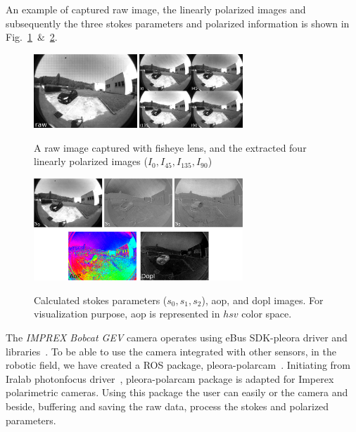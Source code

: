 An example of captured raw image, the linearly polarized
images and subsequently the three stokes parameters and polarized information
is shown in Fig.~\ref{fig:raw-sp}~$\&$~\ref{fig:stokes-aop-dop}.

\begin{figure}
  \centering
  \includegraphics[width=0.7\textwidth]{./content/intro/figures/raw-sp.png}
  \label{fig:raw-sp}
  \caption{A raw image captured with fisheye lens, and the extracted four
    linearly polarized images ($I_0, I_{45}, I_{135}, I_{90}$)}
\end{figure}

\begin{figure}
  \centering
  \includegraphics[width=0.7\textwidth]{./content/intro/figures/stokes_aop_dop.png}
  \label{fig:stokes-aop-dop}
  \caption{Calculated stokes parameters ($s_0, s_1, s_2$), \gls{aop}, and
    \gls{dopl} images. For visualization purpose, \gls{aop} is represented in
    $hsv$ color space.}
\end{figure}



The \textit{IMPREX Bobcat GEV} camera operates using eBus SDK-pleora driver and
libraries~\cite{eBus}. To be able to use the camera integrated with other
sensors, in the robotic field, we have created a ROS
package, pleora-polarcam~\cite{pleora_polarcam}.
Initiating from Iralab photonfocus driver~\cite{ira}, pleora-polarcam package
is adapted for Imperex polarimetric cameras.
Using this package the user can easily  or  the
camera and beside, buffering and saving the raw data, process the stokes and
polarized parameters.



